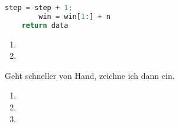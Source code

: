 \documentclass{homework}
\begin{document}
\begin{enumerate}
\begin{lstlisting}[language=python]
		step = step + 1;
		win = win[1:] + n
	return data
\end{lstlisting}

\begin{center}
\setlength{\unitlength}{0.3mm}

\end{center}

\begin{enumerate}
\item
\item
\end{enumerate}


Geht schneller von Hand, zeichne ich dann ein.

\begin{enumerate}
\item
\item
\item
\end{enumerate}

\end{enumerate}
\end{document}
